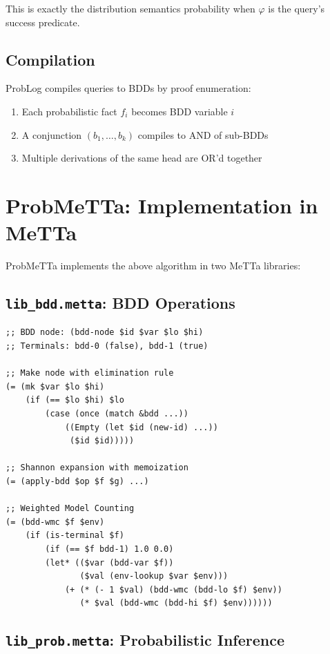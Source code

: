 \documentclass[11pt,a4paper]{article}
\theoremstyle{definition}
\begin{document}
This is exactly the distribution semantics probability when $\varphi$ is
the query's success predicate.

\subsection{Compilation}

ProbLog compiles queries to BDDs by proof enumeration:
\begin{enumerate}
\item Each probabilistic fact $f_i$ becomes BDD variable $i$
\item A conjunction $(b_1, \ldots, b_k)$ compiles to $\mathrm{AND}$ of sub-BDDs
\item Multiple derivations of the same head are $\mathrm{OR}$'d together
\end{enumerate}

\section{ProbMeTTa: Implementation in MeTTa}

ProbMeTTa implements the above algorithm in two MeTTa libraries:

\subsection{\texttt{lib\_bdd.metta}: BDD Operations}

\begin{lstlisting}[language=MeTTa]
;; BDD node: (bdd-node $id $var $lo $hi)
;; Terminals: bdd-0 (false), bdd-1 (true)

;; Make node with elimination rule
(= (mk $var $lo $hi)
    (if (== $lo $hi) $lo
        (case (once (match &bdd ...))
            ((Empty (let $id (new-id) ...))
             ($id $id)))))

;; Shannon expansion with memoization
(= (apply-bdd $op $f $g) ...)

;; Weighted Model Counting
(= (bdd-wmc $f $env)
    (if (is-terminal $f)
        (if (== $f bdd-1) 1.0 0.0)
        (let* (($var (bdd-var $f))
               ($val (env-lookup $var $env)))
            (+ (* (- 1 $val) (bdd-wmc (bdd-lo $f) $env))
               (* $val (bdd-wmc (bdd-hi $f) $env))))))
\end{lstlisting}

\subsection{\texttt{lib\_prob.metta}: Probabilistic Inference}
\end{document}
